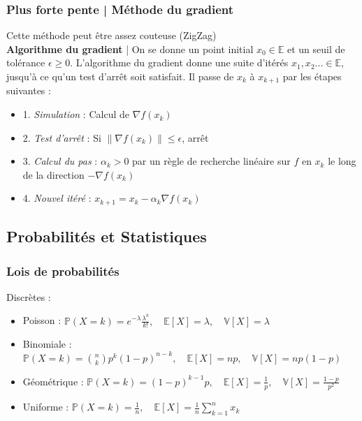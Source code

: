 \documentclass[8pt]{article}
\begin{document}
            \subsubsection{Plus forte pente | Méthode du gradient}
            Cette méthode peut être assez couteuse (ZigZag) \\
            \textbf{Algorithme du gradient} | On se donne un point initial $x_0 \in \mathbb{E}$ et un seuil de tolérance
            $\epsilon \geq 0$. L'algorithme du gradient donne une suite d'itérés $x_1 , x_2 ... \in \mathbb{E}$, jusqu'à ce qu'un test d'arrêt
            soit satisfait. Il passe de $x_k$ à $x_{k+1}$ par les étapes suivantes :
            \begin{itemize}
                \item 1. \textit{Simulation} : Calcul de $\nabla f(x_k)$
                \item 2. \textit{Test d'arrêt} : Si $\lVert \nabla f(x_k) \rVert \leq \epsilon$, arrêt 
                \item 3. \textit{Calcul du pas} : $\alpha_k > 0$ par un règle de recherche linéaire sur $f$ en $x_k$
                le long de la direction $-\nabla f(x_k)$
                \item 4. \textit{Nouvel itéré} : $x_{k+1} = x_k - \alpha_k \nabla f(x_k)$ 
            \end{itemize}
        \subsection{Probabilités et Statistiques}
            \subsubsection{Lois de probabilités}
            Discrètes :
                \begin{itemize}
                    \item Poisson : $\mathbb{P} (X=k) = e^{-\lambda}\frac{\lambda^k}{k!}, \quad \mathbb{E}[X]=\lambda, \quad \mathbb{V}[X]=\lambda$
                    \item Binomiale : $\mathbb{P}(X=k) = \binom{n}{k} p^k (1-p)^{n-k}, \quad \mathbb{E}[X] = np, \quad \mathbb{V}[X] = np(1-p)$
                    \item Géométrique : $\mathbb{P}(X=k) = (1-p)^{k-1}p, \quad \mathbb{E}[X] = \frac{1}{p}, \quad \mathbb{V}[X] = \frac{1-p}{p^{2}}$
                    \item Uniforme : $\mathbb{P}(X=k) = \frac{1}{n}, \quad \mathbb{E}[X] = \frac{1}{n}  \sum^{n}_{k=1} x_k$
                \end{itemize}
\end{document}

